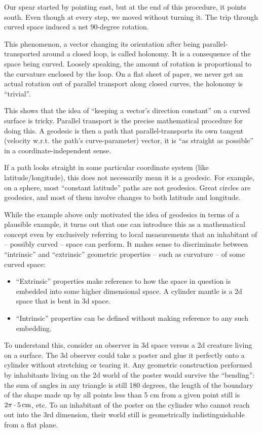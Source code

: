 \documentclass[twocolumn]{article}
\providecommand{\tightlist}{%
   \setlength{\itemsep}{0pt}\setlength{\parskip}{0pt}}
\begin{document}
Our spear started by pointing east, but at the end of this procedure,
it points south. Even though at every step, we moved without turning it.
The trip through curved space induced a net 90-degree rotation.

This phenomenon, a vector changing its orientation after being
parallel-transported around a closed loop, is called holonomy. It is a
consequence of the space being curved. Loosely speaking, the amount of
rotation is proportional to the curvature enclosed by the loop. On a
flat sheet of paper, we never get an actual rotation out of parallel
transport along closed curves, the holonomy is ``trivial''.

This shows that the idea of ``keeping a vector's direction constant''
on a curved surface is tricky. Parallel transport is the precise
mathematical procedure for doing this. A geodesic is then a path that
parallel-transports its own tangent (velocity w.r.t. the path's
curve-parameter) vector, it is ``as straight as possible'' in a
coordinate-independent sense.

If a path looks straight in some particular coordinate system (like
latitude/longitude), this does not necessarily mean it is a
geodesic. For example, on a sphere, most ``constant latitude'' paths
are not geodesics. Great circles are geodesics, and most of them
involve changes to both latitude and longitude.

While the example above only motivated the idea of geodesics in terms
of a plausible example, it turns out that one can introduce this as a
mathematical concept even by exclusively referring to local
measurements that an inhabitant of -- possibly curved -- space can
perform. It makes sense to discriminate between ``intrinsic'' and
``extrinsic'' geometric properties -- such as curvature -- of some
curved space:

\begin{itemize}
\tightlist
\item
  ``Extrinsic'' properties make reference to how the space in question
  is embedded into some higher dimensional space. A cylinder mantle is
  a 2d space that is bent in 3d space.
\item
  ``Intrinsic'' properties can be defined without making reference to
  any such embedding.
\end{itemize}

To understand this, consider an observer in 3d space versus a 2d
creature living on a surface. The 3d observer could take a poster and
glue it perfectly onto a cylinder without stretching or tearing
it. Any geometric construction performed by inhabitants living on the
2d world of the poster would survive the ``bending'': the sum of
angles in any triangle is still 180 degrees, the length of the
boundary of the shape made up by all points less than 5 cm from a
given point still is $2\pi\cdot5\,{\rm cm}$, etc. To an inhabitant of
the poster on the cylinder who cannot reach out into the 3rd
dimension, their world still is geometrically indistinguishable from a
flat plane.
\end{document}
